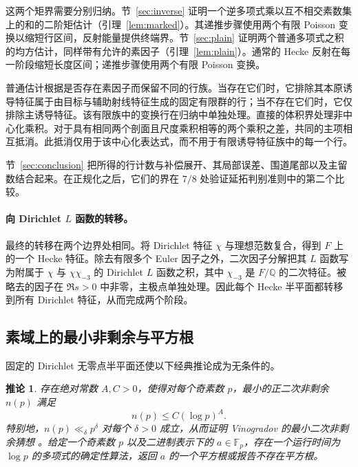 \documentclass[11pt,a4paper]{article}
\numberwithin{equation}{section}
\numberwithin{figure}{section}
\newtheorem{corollary}[theorem]{推论}
\theoremstyle{definition}
\theoremstyle{remark}
\begin{document}
这两个矩界需要分别归纳。节~\ref{sec:inverse} 证明一个逆多项式乘以互不相交素数集上的和的二阶矩估计（引理~\ref{lem:marked}）。其递推步骤使用两个有限 Poisson 变换以缩短行区间，反射能量提供终端界。节~\ref{sec:plain} 证明两个普通多项式之积的均方估计，同样带有允许的素因子（引理~\ref{lem:plain}）。通常的 Hecke 反射在每一阶段缩短长度区间；递推步骤使用两个有限 Poisson 变换。

普通估计根据是否存在素因子而保留不同的行族。当存在它们时，它排除其本原诱导特征属于由目标与辅助射线特征生成的固定有限群的行；当不存在它们时，它仅排除主诱导特征。该有限族中的变换行在归纳中单独处理。直接的体积界处理非中心化乘积。对于具有相同两个剖面且尺度乘积相等的两个乘积之差，共同的主项相互抵消。此抵消仅用于该中心化表达式，而不用于有限诱导特征族中的每一个行。

节~\ref{sec:conclusion} 把所得的行计数与补偿展开、其局部误差、围道尾部以及主留数结合起来。在正规化之后，它们的界在 $7/8$ 处验证延拓判别准则中的第二个比较。

\paragraph{向 Dirichlet $L$ 函数的转移。}
最终的转移在两个边界处相同。将 Dirichlet 特征 $\chi$ 与理想范数复合，得到 $F$ 上的一个 Hecke 特征。除去有限多个 Euler 因子之外，二次因子分解把其 $L$ 函数写为附属于 $\chi$ 与 $\chi\chi_{-3}$ 的 Dirichlet $L$ 函数之积，其中 $\chi_{-3}$ 是 $F/\mathbb Q$ 的二次特征。被略去的因子在 $\Re s>0$ 中非零，主极点单独处理。因此每个 Hecke 半平面都转移到所有 Dirichlet 特征，从而完成两个阶段。

\subsection*{素域上的最小非剩余与平方根}

固定的 Dirichlet 无零点半平面还使以下经典推论成为无条件的。

\begin{corollary}\label{cor:nonresidues-square-roots}
存在绝对常数 $A,C>0$，使得对每个奇素数 $p$，最小的正二次非剩余 $n(p)$ 满足
\[
 n(p)\le C(\log p)^A.
\]
特别地，$n(p)\ll_\delta p^\delta$ 对每个 $\delta>0$ 成立，从而证明 Vinogradov 的最小二次非剩余猜想 \cite[猜想 1.1]{TaoNonresidues}。给定一个奇素数 $p$ 以及二进制表示下的 $a\in\mathbb F_p$，存在一个运行时间为 $\log p$ 的多项式的确定性算法，返回 $a$ 的一个平方根或报告不存在平方根。
\end{corollary}
\end{document}
